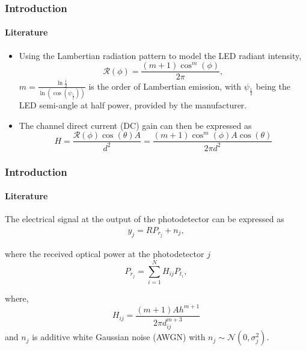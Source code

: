\documentclass[slidestop,usepdftitle=false]{gvvslides}
\providecommand{\brak}[1]{\ensuremath{\left(#1\right)}}
\begin{document}
\begin{frame}
\frametitle{Introduction}
\framesubtitle{Literature}
\begin{itemize}
\vfill
\item<1->Using the Lambertian radiation pattern to model the LED radiant intensity, %
\begin{equation}
\mathcal{R}\brak{\phi}=\frac{\brak{m+1}\cos^m\brak{\phi}}{2\pi}, \nonumber
\end{equation}
$m=\frac{\ln{\frac{1}{2}}}{\ln\brak{\cos\brak{\psi_{\frac{1}{2}}}}}$ is the order of Lambertian emission, with $\psi_{\frac{1}{2}}$ being the LED semi-angle at half power, provided by the manufacturer.\\
\vfill
\item<2>The channel direct current (DC) gain can then be  expressed as %
\begin{equation}
\label{propagation_old}
H=\frac{\mathcal{R}(\phi)\cos(\theta)A}{d^2}=\frac{\brak{m+1}\cos^m\brak{\phi}A\cos(\theta)}{2\pi d^2} \nonumber
\end{equation}
\vfill
\end{itemize}
\end{frame}


\begin{frame}
\frametitle{Introduction}
\framesubtitle{Literature}
\begin{list}{} {} 
\item<1-> The electrical signal at the output
of the photodetector can be expressed as 
%
\begin{align}
\label{rx_j}
y_j=RP_{r_j}+n_j,\nonumber
\end{align}
%
\item<2->
 where the received optical power at the photodetector $j$
\begin{equation}
P_{r_j} = \sum_{i=1}^NH_{ij}  P_{t_i},\nonumber
\end{equation}
\item<3>
where,
\begin{equation}
\label{propagation}
H_{ij}=\frac{\brak{m+1}Ah^{m+1}}{2\pi d_{ij}^{m+3}}\nonumber
\end{equation}
and $n_j$  is  additive white Gaussian noise (AWGN) with $n_{j}\sim \mathcal{N}\brak{0,\sigma_j^2}$.
\end{list}
\end{frame}
\end{document}
